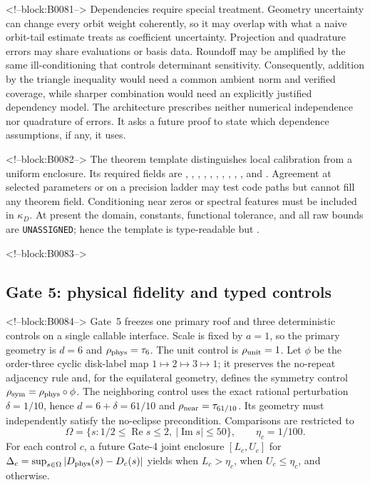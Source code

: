 \documentclass[11pt,a4paper]{article}
\begin{document}
<!--block:B0081-->
Dependencies require special treatment. Geometry uncertainty can change every orbit weight coherently, so it may overlap with what a naive orbit-tail estimate treats as coefficient uncertainty. Projection and quadrature errors may share evaluations or basis data. Roundoff may be amplified by the same ill-conditioning that controls determinant sensitivity. Consequently, addition by the triangle inequality would need a common ambient norm and verified coverage, while sharper combination would need an explicitly justified dependency model. The architecture prescribes neither numerical independence nor quadrature of errors. It asks a future proof to state which dependence assumptions, if any, it uses.

<!--block:B0082-->
The theorem template distinguishes local calibration from a uniform enclosure. Its required fields are , , , , , , , , , , and . Agreement at selected parameters or on a precision ladder may test code paths but cannot fill any theorem field. Conditioning near zeros or spectral features must be included in \(\kappa_D\). At present the domain, constants, functional tolerance, and all raw bounds are \texttt{UNASSIGNED}; hence the template is type-readable but .

<!--block:B0083-->
\subsection{Gate 5: physical fidelity and typed controls}

<!--block:B0084-->
Gate~5 freezes one primary roof and three deterministic controls on a single
callable interface.  Scale is fixed by \(a=1\), so the primary geometry is
\(d=6\) and \(\rho_{\rm phys}=\tau_6\).  The unit control is
\(\rho_{\rm unit}=1\).  Let \(\phi\) be the order-three cyclic disk-label map
\(1\mapsto2\mapsto3\mapsto1\); it preserves the no-repeat adjacency rule and,
for the equilateral geometry, defines the symmetry control
\(\rho_{\rm sym}=\rho_{\rm phys}\circ\phi\).  The neighboring control uses
the exact rational perturbation \(\delta=1/10\), hence
\(d=6+\delta=61/10\) and \(\rho_{\rm near}=\tau_{61/10}\).  Its geometry must
independently satisfy the no-eclipse precondition.  Comparisons are restricted to
\[
  \Omega=\{s:1/2\leq\operatorname{Re}s\leq2,
  \ |\operatorname{Im}s|\leq50\},\qquad \eta_c=1/100.
\]
For each control \(c\), a future Gate-4 joint enclosure
\([L_c,U_c]\) for
\(\Delta_c=\sup_{s\in\Omega}|D_{\rm phys}(s)-D_c(s)|\) yields
 when \(L_c>\eta_c\),  when
\(U_c\leq\eta_c\), and  otherwise.
\end{document}

